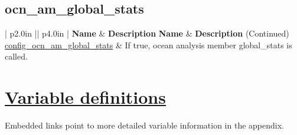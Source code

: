 \subsection[ocn\_am\_global\_stats]{ocn\_am\_global\_stats}
\label{subsec:forward_nm_tab_ocn_am_global_stats}
\vspace{0.5in}
{\small
\begin{center}
\begin{longtable}{| p{2.0in} || p{4.0in} |}
	\hline
	{\bf Name} & {\bf Description} \endfirsthead
	\hline 
	{\bf Name} & {\bf Description} (Continued) \endhead
	\hline
	\hline
	\hyperref[sec:nm_sec_config_ocn_am_global_stats]{config\_ocn\_am\_global\_stats} & If true, ocean analysis member global\_stats is called. \\
	\hline
\end{longtable}
\end{center}
}
\section[Variable definitions]{\hyperref[chap:variable_sections]{Variable definitions}}
\label{sec:forward_variable_tables}
Embedded links point to more detailed variable information in the appendix.
